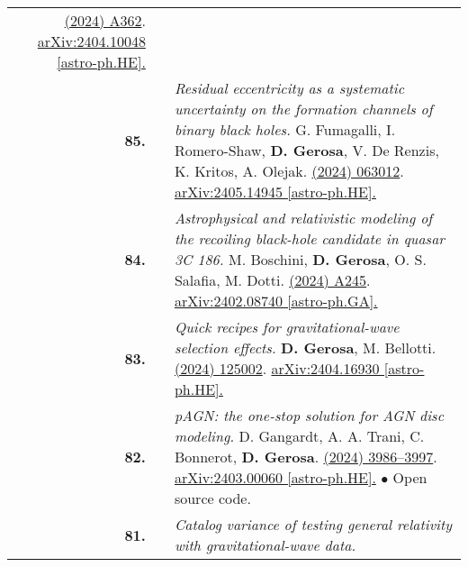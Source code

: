{\begin{longtable}{rp{0.3cm}p{15.8cm}}
\newline{}
\href{https://doi.org/10.1051/0004-6361/202450381}{\aap 690 (2024) A362}. \href{https://arxiv.org/abs/2404.10048}{arXiv:2404.10048 [astro-ph.HE].}
\vspace{0.09cm}\\
%
\textbf{85.} & & \textit{Residual eccentricity as a systematic uncertainty on the formation channels of binary black holes.}
\newline{}
G. Fumagalli, I. Romero-Shaw, \textbf{D. Gerosa}, V. De Renzis, K. Kritos, A. Olejak.
\newline{}
\href{https://journals.aps.org/prd/abstract/10.1103/PhysRevD.110.063012}{\prd 110 (2024) 063012}. \href{https://arxiv.org/abs/2405.14945}{arXiv:2405.14945 [astro-ph.HE].}
\vspace{0.09cm}\\
%
\textbf{84.} & & \textit{Astrophysical and relativistic modeling of the recoiling black-hole candidate in quasar 3C 186.}
\newline{}
M. Boschini, \textbf{D. Gerosa}, O. S. Salafia, M. Dotti.
\newline{}
\href{https://doi.org/10.1051/0004-6361/202449596}{\aap 686 (2024) A245}. \href{https://arxiv.org/abs/2402.08740}{arXiv:2402.08740 [astro-ph.GA].}
\vspace{0.09cm}\\
%
\textbf{83.} & & \textit{Quick recipes for gravitational-wave selection effects.}
\newline{}
\textbf{D. Gerosa}, M. Bellotti.
\newline{}
\href{https://iopscience.iop.org/article/10.1088/1361-6382/ad4509}{\cqg 41 (2024) 125002}. \href{https://arxiv.org/abs/2404.16930}{arXiv:2404.16930 [astro-ph.HE].}
\vspace{0.09cm}\\
%
\textbf{82.} & & \textit{pAGN: the one-stop solution for AGN disc modeling.}
\newline{}
D. Gangardt, A. A. Trani, C. Bonnerot, \textbf{D. Gerosa}.
\newline{}
\href{https://doi.org/10.1093/mnras/stae1117}{\mnras 530 (2024) 3986–3997}. \href{https://arxiv.org/abs/2403.00060}{arXiv:2403.00060 [astro-ph.HE].}
\newline{}
\textcolor{color1}{$\bullet$} Open source code.
\vspace{0.09cm}\\
%
\textbf{81.} & & \textit{Catalog variance of testing general relativity with gravitational-wave data.}
\newline{}

\end{longtable}}
